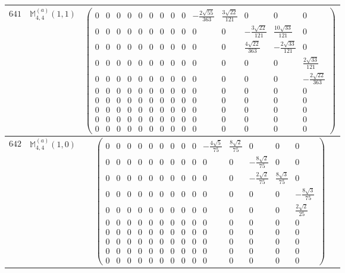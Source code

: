 \documentclass[fleqn,8pt,landscape]{jsarticle}
\begin{document}
\begin{center}
\begin{longtable}{ccc}
$ 641 $ & $ \mathbb{M}_{4,4}^{(a)}(1,1) $ & $ \begin{pmatrix} 0 & 0 & 0 & 0 & 0 & 0 & 0 & 0 & 0 & - \frac{2 \sqrt{55}}{363} & \frac{3 \sqrt{22}}{121} & 0 & 0 & 0 \\ 0 & 0 & 0 & 0 & 0 & 0 & 0 & 0 & 0 & 0 & 0 & - \frac{3 \sqrt{22}}{121} & \frac{10 \sqrt{33}}{121} & 0 \\ 0 & 0 & 0 & 0 & 0 & 0 & 0 & 0 & 0 & 0 & 0 & \frac{4 \sqrt{22}}{363} & - \frac{2 \sqrt{33}}{121} & 0 \\ 0 & 0 & 0 & 0 & 0 & 0 & 0 & 0 & 0 & 0 & 0 & 0 & 0 & \frac{2 \sqrt{33}}{121} \\ 0 & 0 & 0 & 0 & 0 & 0 & 0 & 0 & 0 & 0 & 0 & 0 & 0 & - \frac{2 \sqrt{22}}{363} \\ 0 & 0 & 0 & 0 & 0 & 0 & 0 & 0 & 0 & 0 & 0 & 0 & 0 & 0 \\ 0 & 0 & 0 & 0 & 0 & 0 & 0 & 0 & 0 & 0 & 0 & 0 & 0 & 0 \\ 0 & 0 & 0 & 0 & 0 & 0 & 0 & 0 & 0 & 0 & 0 & 0 & 0 & 0 \\ 0 & 0 & 0 & 0 & 0 & 0 & 0 & 0 & 0 & 0 & 0 & 0 & 0 & 0 \\ 0 & 0 & 0 & 0 & 0 & 0 & 0 & 0 & 0 & 0 & 0 & 0 & 0 & 0 \end{pmatrix} $ \\ \hline
$ 642 $ & $ \mathbb{M}_{4,4}^{(a)}(1,0) $ & $ \begin{pmatrix} 0 & 0 & 0 & 0 & 0 & 0 & 0 & 0 & 0 & - \frac{4 \sqrt{5}}{75} & \frac{8 \sqrt{2}}{75} & 0 & 0 & 0 \\ 0 & 0 & 0 & 0 & 0 & 0 & 0 & 0 & 0 & 0 & 0 & - \frac{8 \sqrt{2}}{75} & 0 & 0 \\ 0 & 0 & 0 & 0 & 0 & 0 & 0 & 0 & 0 & 0 & 0 & - \frac{2 \sqrt{2}}{75} & \frac{8 \sqrt{3}}{75} & 0 \\ 0 & 0 & 0 & 0 & 0 & 0 & 0 & 0 & 0 & 0 & 0 & 0 & 0 & - \frac{8 \sqrt{3}}{75} \\ 0 & 0 & 0 & 0 & 0 & 0 & 0 & 0 & 0 & 0 & 0 & 0 & 0 & \frac{2 \sqrt{2}}{25} \\ 0 & 0 & 0 & 0 & 0 & 0 & 0 & 0 & 0 & 0 & 0 & 0 & 0 & 0 \\ 0 & 0 & 0 & 0 & 0 & 0 & 0 & 0 & 0 & 0 & 0 & 0 & 0 & 0 \\ 0 & 0 & 0 & 0 & 0 & 0 & 0 & 0 & 0 & 0 & 0 & 0 & 0 & 0 \\ 0 & 0 & 0 & 0 & 0 & 0 & 0 & 0 & 0 & 0 & 0 & 0 & 0 & 0 \\ 0 & 0 & 0 & 0 & 0 & 0 & 0 & 0 & 0 & 0 & 0 & 0 & 0 & 0 \end{pmatrix} $ \\ \hline

\end{longtable}
\end{center}
\end{document}
